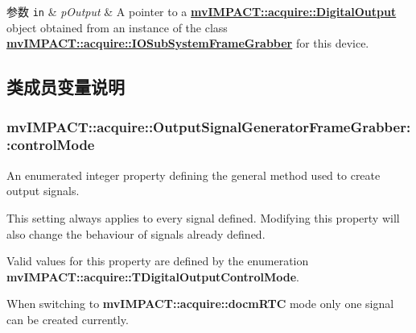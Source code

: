 \begin{DoxyParams}[1]{参数}
\mbox{\tt in}  & {\em p\+Output} & A pointer to a {\bfseries \hyperlink{classmv_i_m_p_a_c_t_1_1acquire_1_1_digital_output}{mv\+I\+M\+P\+A\+C\+T\+::acquire\+::\+Digital\+Output}} object obtained from an instance of the class {\bfseries \hyperlink{classmv_i_m_p_a_c_t_1_1acquire_1_1_i_o_sub_system_frame_grabber}{mv\+I\+M\+P\+A\+C\+T\+::acquire\+::\+I\+O\+Sub\+System\+Frame\+Grabber}} for this device. \\
\hline
\end{DoxyParams}


\subsection{类成员变量说明}
\hypertarget{classmv_i_m_p_a_c_t_1_1acquire_1_1_output_signal_generator_frame_grabber_a16a2f8eea50086e015adb7e40088e765}{
\subsubsection[{control\+Mode}]{ mv\+I\+M\+P\+A\+C\+T\+::acquire\+::\+Output\+Signal\+Generator\+Frame\+Grabber\+::control\+Mode}}\label{classmv_i_m_p_a_c_t_1_1acquire_1_1_output_signal_generator_frame_grabber_a16a2f8eea50086e015adb7e40088e765}


An enumerated integer property defining the general method used to create output signals. 

This setting always applies to every signal defined. Modifying this property will also change the behaviour of signals already defined.

Valid values for this property are defined by the enumeration {\bfseries mv\+I\+M\+P\+A\+C\+T\+::acquire\+::\+T\+Digital\+Output\+Control\+Mode}.

When switching to {\bfseries mv\+I\+M\+P\+A\+C\+T\+::acquire\+::docm\+R\+T\+C} mode only one signal can be created currently.

